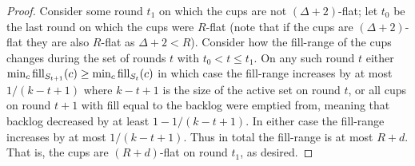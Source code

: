 \begin{proof}
  Consider some round $t_1$ on which the cups are not $(\Delta +
  2)$-flat; let $t_0$ be the last round on which the cups were
  $R$-flat (note that if the cups are $(\Delta+2)$-flat they are
  also $R$-flat as $\Delta + 2 < R$). Consider how the fill-range
  of the cups changes during the set of rounds
  $t$ with $t_0 < t \le t_1$. On any such round $t$ either $\min_c
  \operatorname{\text{\textup{fill}}}_{S_{t+1}}(c) \ge \min_c \operatorname{\text{\textup{fill}}}_{S_{t}}(c)$ in which case the
  fill-range increases by at most $1/(k-t+1)$ where $k-t+1$ is the
  size of the active set on round $t$, or all cups on round $t+1$
  with fill equal to the backlog were emptied from, meaning that
  backlog decreased by at least $1-1/(k-t+1)$. In either case the
  fill-range increases by at most $1/(k-t+1)$. Thus in total the
  fill-range is at most $R + d$. That is, the cups are
  $(R+d)$-flat on round $t_1$, as desired.

\end{proof}
